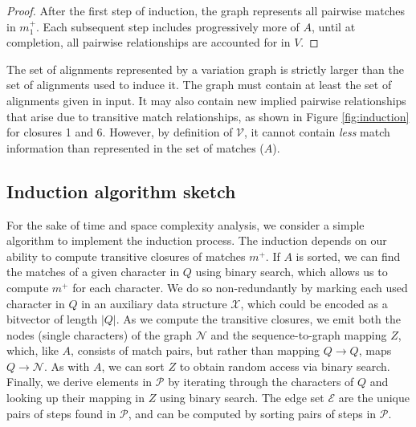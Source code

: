 \documentclass{bioinfo}
\theoremstyle{definition}
\begin{document}
\begin{proof}
After the first step of induction, the graph represents all pairwise matches in $m_1^+$.
Each subsequent step includes progressively more of $A$, until at completion, all pairwise relationships are accounted for in $V$.
\end{proof}

The set of alignments represented by a variation graph is strictly larger than the set of alignments used to induce it.
The graph must contain at least the set of alignments given in input.
It may also contain new implied pairwise relationships that arise due to transitive match relationships, as shown in Figure \ref{fig:induction} for closures 1 and 6.
However, by definition of $\mathcal{V}$, it cannot contain \textit{less} match information than represented in the set of matches ($A$).



\subsection{Induction algorithm sketch}

For the sake of time and space complexity analysis, we consider a simple algorithm to implement the induction process.
The induction depends on our ability to compute transitive closures of matches $m^+$.
If $A$ is sorted, we can find the matches of a given character in $Q$ using binary search, which allows us to compute $m^+$ for each character.
We do so non-redundantly by marking each used character in $Q$ in an auxiliary data structure $\mathcal{X}$, which could be encoded as a bitvector of length $|Q|$.
As we compute the transitive closures, we emit both the nodes (single characters) of the graph $\mathcal{N}$ and the sequence-to-graph mapping $Z$, which, like $A$, consists of match pairs, but rather than mapping $Q \to Q$, maps $Q \to \mathcal{N}$.
As with $A$, we can sort $Z$ to obtain random access via binary search.
Finally, we derive elements in $\mathcal{P}$ by iterating through the characters of $Q$ and looking up their mapping in $Z$ using binary search.
The edge set $\mathcal{E}$ are the unique pairs of steps found in $\mathcal{P}$, and can be computed by sorting pairs of steps in $\mathcal{P}$.
\end{document}
